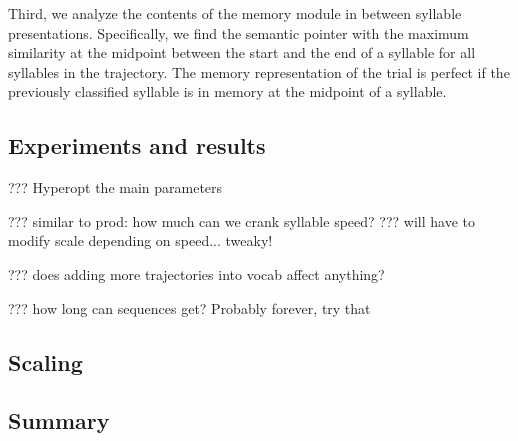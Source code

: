 Third, we analyze the contents
of the memory module
in between syllable presentations.
Specifically,
we find the semantic pointer
with the maximum similarity
at the midpoint between
the start and the end of a syllable
for all syllables in the trajectory.
The memory representation of the trial
is perfect if the
previously classified syllable
is in memory at the midpoint
of a syllable.

\subsection{Experiments and results}

??? Hyperopt the main parameters

??? similar to prod: how much can we crank syllable speed?
??? will have to modify scale depending on speed... tweaky!

??? does adding more trajectories into vocab affect anything?

??? how long can sequences get? Probably forever, try that

\subsection{Scaling}


\subsection{Summary}

